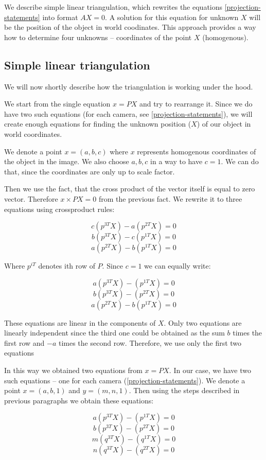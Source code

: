 We describe simple linear triangulation, which rewrites the equations
\ref{projection-statements} into format $AX = 0$. A solution for this equation
for unknown $X$ will be the position of the object in world coodinates. This
approach provides a way how to determine four unknowns -- coordinates
of the point $X$ (homogenous).


\subsection{Simple linear triangulation}

We will now shortly describe how the triangulation is working under the hood.

We start from the single equation $x = PX$ and try to rearrange it. Since we do
have two such equations (for each camera, see \ref{projection-statements}), we
will create enough equations for finding the unknown position ($X$) of our
object in world coordinates.

We denote a point $x=(a, b, c)$ where $x$ represents homogenous coordinates of
the object in the image. We also choose $a, b, c$ in a way to have $c = 1$. We
can do that, since the coordinates are only up to scale factor.

Then we use the fact, that the cross product of the vector itself is equal to
zero vector. Therefore $x \times PX = 0$ from the previous fact. We rewrite it
to three equations using crossproduct rules:

$$ c(p^{3T}X) - a(p^{2T}X) = 0 $$
$$ b(p^{3T}X) - c(p^{1T}X) = 0 $$
$$ a(p^{2T}X) - b(p^{1T}X) = 0 $$

Where $p^{iT}$ denotes ith row of $P$. Since $c = 1$ we can equally write:

$$ a(p^{3T}X) - (p^{1T}X) = 0 $$
$$ b(p^{3T}X) - (p^{2T}X) = 0 $$
$$ a(p^{2T}X) - b(p^{1T}X) = 0 $$

These equations are linear in the components of $X$. Only two equations are
linearly independent since the third one could be obtained as the sum $b$ times
the first row and $-a$ times the second row. Therefore, we use only the first
two equations

In this way we obtained two equations from $x = PX$. In our case, we have
two such equations -- one for each camera (\ref{projection-statements}). We
denote a point $x = (a, b, 1)$ and $y=(m, n, 1)$. Then using the steps described in previous paragraphs we obtain these equations:

$$ a(p^{3T}X) - (p^{1T}X) = 0 $$
$$ b(p^{3T}X) - (p^{2T}X) = 0 $$
$$ m(q^{3T}X) - (q^{1T}X) = 0 $$
$$ n(q^{3T}X) - (q^{2T}X) = 0 $$

